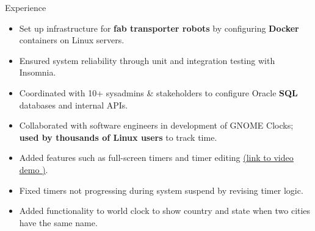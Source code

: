 \documentclass{resume} %
\begin{document}

\begin{workSection}{Experience}
	
	\experienceItem[
	company=Texas Instruments,
	location=Dallas{,} TX,
	position=Information Technology Intern,
	duration= May 2024 - August 2024,
	]
	\begin{itemize}
		\vspace{-0.5em}
		\itemsep -6pt {}
		\item Set up infrastructure for \textbf{fab transporter robots} by configuring \textbf{Docker} containers on Linux servers.
		\item Ensured system reliability through unit and integration testing with Insomnia.
		\item Coordinated with 10+ sysadmins \& stakeholders to configure Oracle \textbf{SQL} databases and internal APIs.
	\end{itemize}
	
	\experienceItem[
	company=GNOME Foundation,
	location=Remote,
	position=Open-Source Contributor,
	duration=December 2023 {-} June 2024
	]
	\begin{itemize}
	\vspace{-0.5em}
	\itemsep -6pt {}
	\item Collaborated with software engineers in development of GNOME Clocks; \textbf{used by thousands of Linux users} to track  time.
	\item Added features such as full-screen timers and timer editing \href{https://youtu.be/fDzYWusOLow}{(\underline{link to video demo \faExternalLink})}. %
	\item Fixed timers not progressing during system suspend by revising timer logic. %
	\item Added functionality to world clock to show country and state when two cities have the same name. %
	\end{itemize}
	

\end{workSection}
\end{document}
